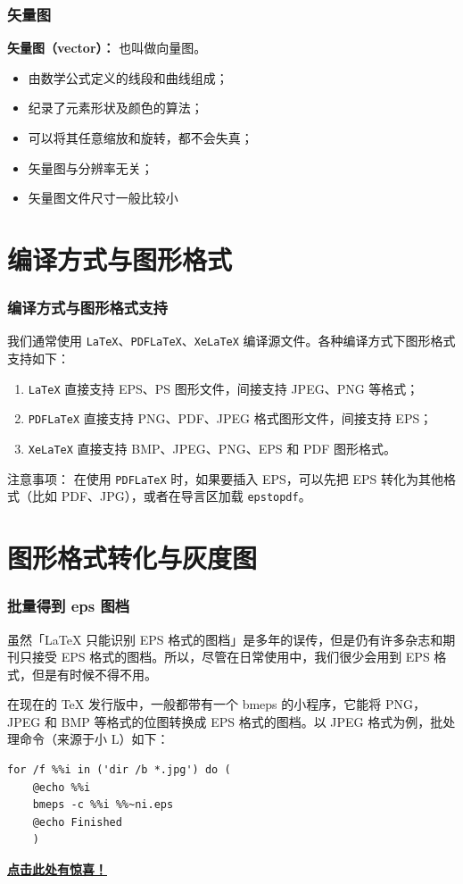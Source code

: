 \documentclass[10pt]{beamer}
\numberwithin{figure}{section}
\newcommand{\pbf}[1]{\noindent\textbf{#1}}
\begin{document}
\begin{frame}[c]\frametitle{矢量图}

\pbf{矢量图（vector）：} 也叫做向量图。

\begin{itemize}
  \item 由数学公式定义的线段和曲线组成；
  \item 纪录了元素形状及颜色的算法；
  \item 可以将其任意缩放和旋转，都不会失真；
  \item 矢量图与分辨率无关；
  \item 矢量图文件尺寸一般比较小
\end{itemize}
\end{frame}

\section[编译方式支持]{编译方式与图形格式}

\begin{frame}[c,fragile]\frametitle{编译方式与图形格式支持}

我们通常使用 \lstinline{LaTeX}、\lstinline{PDFLaTeX}、\lstinline{XeLaTeX} 编译源文件。各种编译方式下图形格式支持如下：

\begin{enumerate}
  \item \lstinline{LaTeX} 直接支持 EPS、PS 图形文件，间接支持 JPEG、PNG 等格式；
  \item \lstinline{PDFLaTeX} 直接支持 PNG、PDF、JPEG 格式图形文件，间接支持 EPS；
  \item \lstinline{XeLaTeX} 直接支持 BMP、JPEG、PNG、EPS 和 PDF 图形格式。
\end{enumerate}

\begin{alertblock}{注意事项：}
在使用 \lstinline{PDFLaTeX} 时，如果要插入 EPS，可以先把 EPS 转化为其他格式（比如 PDF、JPG），或者在导言区加载 \lstinline{epstopdf}。
\end{alertblock}

\end{frame}


\section[格式转化]{图形格式转化与灰度图}
\begin{frame}[c,fragile]\frametitle{批量得到 eps 图档}
虽然「\LaTeX{} 只能识别 EPS 格式的图档」是多年的误传，但是仍有许多杂志和期刊只接受 EPS 格式的图档。所以，尽管在日常使用中，我们很少会用到 EPS 格式，但是有时候不得不用。

在现在的 TeX 发行版中，一般都带有一个 bmeps 的小程序，它能将 PNG，JPEG 和 BMP 等格式的位图转换成 EPS 格式的图档。以 JPEG 格式为例，批处理命令（来源于小 L）如下：
\begin{lstlisting}
for /f %%i in ('dir /b *.jpg') do (
    @echo %%i
    bmeps -c %%i %%~ni.eps
    @echo Finished
    )
\end{lstlisting}

\href{http://liam0205.me/2014/08/21/bitmap-convert-to-eps-batch/}{\textbf{点击此处有惊喜！}}

\end{frame}
\end{document}
